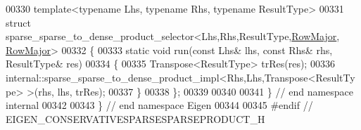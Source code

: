 \begin{DoxyCode}
00330 \textcolor{keyword}{template}<\textcolor{keyword}{typename} Lhs, \textcolor{keyword}{typename} Rhs, \textcolor{keyword}{typename} ResultType>
00331 \textcolor{keyword}{struct }sparse\_sparse\_to\_dense\_product\_selector<Lhs,Rhs,ResultType,\hyperlink{group__enums_ggaacded1a18ae58b0f554751f6cdf9eb13acfcde9cd8677c5f7caf6bd603666aae3}{RowMajor},
      \hyperlink{group__enums_ggaacded1a18ae58b0f554751f6cdf9eb13acfcde9cd8677c5f7caf6bd603666aae3}{RowMajor}>
00332 \{
00333   \textcolor{keyword}{static} \textcolor{keywordtype}{void} run(\textcolor{keyword}{const} Lhs& lhs, \textcolor{keyword}{const} Rhs& rhs, ResultType& res)
00334   \{
00335     Transpose<ResultType> trRes(res);
00336     internal::sparse\_sparse\_to\_dense\_product\_impl<Rhs,Lhs,Transpose<ResultType> >(rhs, lhs, trRes);
00337   \}
00338 \};
00339 
00340 
00341 \} \textcolor{comment}{// end namespace internal}
00342 
00343 \} \textcolor{comment}{// end namespace Eigen}
00344 
00345 \textcolor{preprocessor}{#endif // EIGEN\_CONSERVATIVESPARSESPARSEPRODUCT\_H}
\end{DoxyCode}
